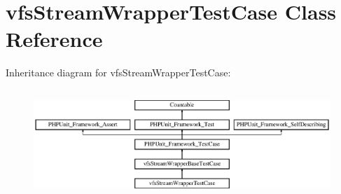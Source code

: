 \hypertarget{classorg_1_1bovigo_1_1vfs_1_1vfs_stream_wrapper_test_case}{}\section{vfs\+Stream\+Wrapper\+Test\+Case Class Reference}
\label{classorg_1_1bovigo_1_1vfs_1_1vfs_stream_wrapper_test_case}
Inheritance diagram for vfs\+Stream\+Wrapper\+Test\+Case\+:\begin{figure}[H]
\begin{center}
\leavevmode
\includegraphics[height=4.129793cm]{classorg_1_1bovigo_1_1vfs_1_1vfs_stream_wrapper_test_case}
\end{center}
\end{figure}
